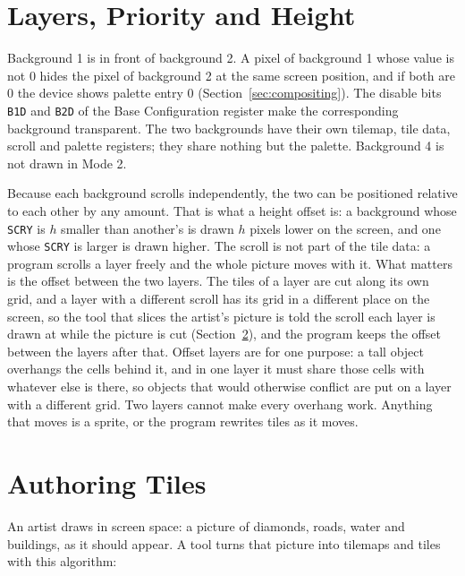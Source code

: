 \section{Layers, Priority and Height}
\label{sec:m2-layers}

Background 1 is in front of background 2. A pixel of background 1 whose value is not 0 hides the pixel of background 2
at the same screen position, and if both are 0 the device shows palette entry 0 (Section~\ref{sec:compositing}). The
disable bits \texttt{B1D} and \texttt{B2D} of the Base Configuration register make the corresponding background
transparent. The two backgrounds have their own tilemap, tile data, scroll and palette registers; they share nothing
but the palette. Background 4 is not drawn in Mode 2.

Because each background scrolls independently, the two can be positioned relative to each other by any amount. That is
what a height offset is: a background whose \texttt{SCRY} is $h$ smaller than another's is drawn $h$ pixels lower on
the screen, and one whose \texttt{SCRY} is larger is drawn higher. The scroll is not part of the tile data: a program
scrolls a layer freely and the whole picture moves with it. What matters is the offset between the two layers. The
tiles of a layer are cut along its own grid, and a layer with a different scroll has its grid in a different place on
the screen, so the tool that slices the artist's picture is told the scroll each layer is drawn at while the picture is
cut (Section~\ref{sec:m2-authoring}), and the program keeps the offset between the layers after that. Offset layers are
for one purpose: a tall object overhangs the cells behind it, and in one layer it must share those cells with whatever
else is there, so objects that would otherwise conflict are put on a layer with a different grid. Two layers cannot
make every overhang work. Anything that moves is a sprite, or the program rewrites tiles as it moves.

\section{Authoring Tiles}
\label{sec:m2-authoring}

An artist draws in screen space: a picture of diamonds, roads, water and buildings, as it should appear. A tool turns
that picture into tilemaps and tiles with this algorithm:

